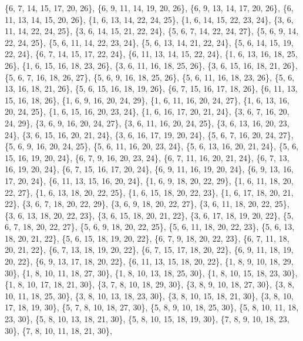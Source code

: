 \documentclass[11pt,a4paper]{article}
\begin{document}
{\{6, 7, 14, 15, 17, 20, 26\}, \{6, 9, 11, 14, 19, 20, 26\}, \{6, 9, 13, 14, 17, 20, 26\}, \{6, 11, 13, 14, 15, 20, 26\}, \{1, 6, 13, 14, 22, 24, 25\},
\{1, 6, 14, 15, 22, 23, 24\}, \{3, 6, 11, 14, 22, 24, 25\}, \{3, 6, 14, 15, 21, 22, 24\}, \{5, 6, 7, 14, 22, 24, 27\}, \{5, 6, 9, 14, 22, 24, 25\},
\{5, 6, 11, 14, 22, 23, 24\}, \{5, 6, 13, 14, 21, 22, 24\}, \{5, 6, 14, 15, 19, 22, 24\}, \{6, 7, 14, 15, 17, 22, 24\}, \{6, 11, 13, 14, 15, 22, 24\},
\{1, 6, 13, 16, 18, 25, 26\}, \{1, 6, 15, 16, 18, 23, 26\}, \{3, 6, 11, 16, 18, 25, 26\}, \{3, 6, 15, 16, 18, 21, 26\}, \{5, 6, 7, 16, 18, 26, 27\},
\{5, 6, 9, 16, 18, 25, 26\}, \{5, 6, 11, 16, 18, 23, 26\}, \{5, 6, 13, 16, 18, 21, 26\}, \{5, 6, 15, 16, 18, 19, 26\}, \{6, 7, 15, 16, 17, 18, 26\},
\{6, 11, 13, 15, 16, 18, 26\}, \{1, 6, 9, 16, 20, 24, 29\}, \{1, 6, 11, 16, 20, 24, 27\}, \{1, 6, 13, 16, 20, 24, 25\}, \{1, 6, 15, 16, 20, 23, 24\},
\{1, 6, 16, 17, 20, 21, 24\}, \{3, 6, 7, 16, 20, 24, 29\}, \{3, 6, 9, 16, 20, 24, 27\}, \{3, 6, 11, 16, 20, 24, 25\}, \{3, 6, 13, 16, 20, 23, 24\},
\{3, 6, 15, 16, 20, 21, 24\}, \{3, 6, 16, 17, 19, 20, 24\}, \{5, 6, 7, 16, 20, 24, 27\}, \{5, 6, 9, 16, 20, 24, 25\}, \{5, 6, 11, 16, 20, 23, 24\},
\{5, 6, 13, 16, 20, 21, 24\}, \{5, 6, 15, 16, 19, 20, 24\}, \{6, 7, 9, 16, 20, 23, 24\}, \{6, 7, 11, 16, 20, 21, 24\}, \{6, 7, 13, 16, 19, 20, 24\},
\{6, 7, 15, 16, 17, 20, 24\}, \{6, 9, 11, 16, 19, 20, 24\}, \{6, 9, 13, 16, 17, 20, 24\}, \{6, 11, 13, 15, 16, 20, 24\}, \{1, 6, 9, 18, 20, 22, 29\},
\{1, 6, 11, 18, 20, 22, 27\}, \{1, 6, 13, 18, 20, 22, 25\}, \{1, 6, 15, 18, 20, 22, 23\}, \{1, 6, 17, 18, 20, 21, 22\}, \{3, 6, 7, 18, 20, 22, 29\},
\{3, 6, 9, 18, 20, 22, 27\}, \{3, 6, 11, 18, 20, 22, 25\}, \{3, 6, 13, 18, 20, 22, 23\}, \{3, 6, 15, 18, 20, 21, 22\}, \{3, 6, 17, 18, 19, 20, 22\},
\{5, 6, 7, 18, 20, 22, 27\}, \{5, 6, 9, 18, 20, 22, 25\}, \{5, 6, 11, 18, 20, 22, 23\}, \{5, 6, 13, 18, 20, 21, 22\}, \{5, 6, 15, 18, 19, 20, 22\},
\{6, 7, 9, 18, 20, 22, 23\}, \{6, 7, 11, 18, 20, 21, 22\}, \{6, 7, 13, 18, 19, 20, 22\}, \{6, 7, 15, 17, 18, 20, 22\}, \{6, 9, 11, 18, 19, 20, 22\},
\{6, 9, 13, 17, 18, 20, 22\}, \{6, 11, 13, 15, 18, 20, 22\}, \{1, 8, 9, 10, 18, 29, 30\}, \{1, 8, 10, 11, 18, 27, 30\}, \{1, 8, 10, 13, 18, 25, 30\},
\{1, 8, 10, 15, 18, 23, 30\}, \{1, 8, 10, 17, 18, 21, 30\}, \{3, 7, 8, 10, 18, 29, 30\}, \{3, 8, 9, 10, 18, 27, 30\}, \{3, 8, 10, 11, 18, 25, 30\},
\{3, 8, 10, 13, 18, 23, 30\}, \{3, 8, 10, 15, 18, 21, 30\}, \{3, 8, 10, 17, 18, 19, 30\}, \{5, 7, 8, 10, 18, 27, 30\}, \{5, 8, 9, 10, 18, 25, 30\},
\{5, 8, 10, 11, 18, 23, 30\}, \{5, 8, 10, 13, 18, 21, 30\}, \{5, 8, 10, 15, 18, 19, 30\}, \{7, 8, 9, 10, 18, 23, 30\}, \{7, 8, 10, 11, 18, 21, 30\},
}
\end{document}
